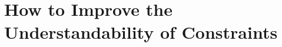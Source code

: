 \documentclass[a4paper,fontsize=11pt]{scrartcl}
\newenvironment{DL}{
  \vspace{0cm}
	\begin{center}
  \begin{tabular}{r l}

}{
  \end{tabular}
	\end{center}
}
\begin{document}

%
%
%


\section{How to Improve the Understandability of Constraints}
\label{sec:transformations}
\end{document}
